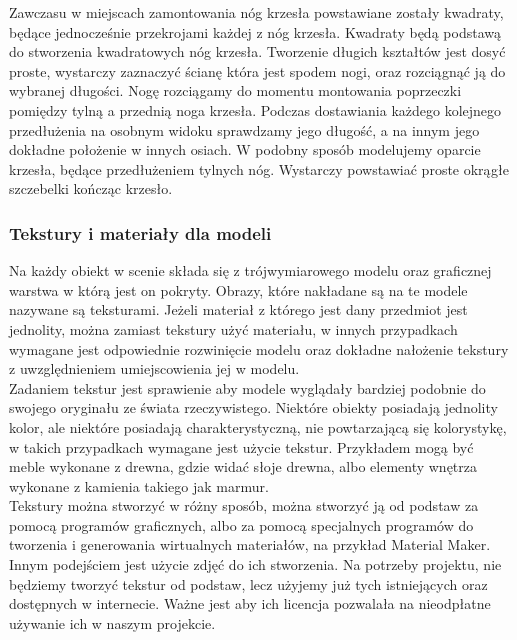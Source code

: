 \documentclass{article} %
\begin{document}
            Zawczasu w miejscach zamontowania nóg krzesła powstawiane zostały kwadraty, będące jednocześnie przekrojami każdej z nóg krzesła. Kwadraty będą podstawą do stworzenia kwadratowych nóg krzesła. Tworzenie długich kształtów jest dosyć proste, wystarczy zaznaczyć ścianę która jest spodem nogi, oraz rozciągnąć ją do wybranej długości. Nogę rozciągamy do momentu montowania poprzeczki pomiędzy tylną a przednią noga krzesła. Podczas dostawiania każdego kolejnego przedłużenia na osobnym widoku sprawdzamy jego długość, a na innym jego dokładne położenie w innych osiach. W podobny sposób modelujemy oparcie krzesła, będące przedłużeniem tylnych nóg. Wystarczy powstawiać proste okrągłe szczebelki kończąc krzesło.
            \\
            
        \subsubsection{Tekstury i materiały dla modeli}
            Na każdy obiekt w scenie składa się z trójwymiarowego modelu oraz graficznej warstwa w którą jest on pokryty. Obrazy, które nakładane są na te modele nazywane są teksturami. Jeżeli materiał z którego jest dany przedmiot jest jednolity, można zamiast tekstury użyć materiału, w innych przypadkach wymagane jest odpowiednie rozwinięcie modelu oraz dokładne nałożenie tekstury z uwzględnieniem umiejscowienia jej w modelu.
            \\
        
            Zadaniem tekstur jest sprawienie aby modele wyglądały bardziej podobnie do swojego oryginału ze świata rzeczywistego. Niektóre obiekty posiadają jednolity kolor, ale niektóre posiadają charakterystyczną, nie powtarzającą się kolorystykę, w takich przypadkach wymagane jest użycie tekstur. Przykładem mogą być meble wykonane z drewna, gdzie widać słoje drewna, albo elementy wnętrza wykonane z kamienia takiego jak marmur.
            \\
            
            Tekstury można stworzyć w różny sposób, można stworzyć ją od podstaw za pomocą programów graficznych, albo za pomocą specjalnych programów do tworzenia i generowania wirtualnych materiałów, na przykład Material Maker. Innym podejściem jest użycie zdjęć do ich stworzenia. Na potrzeby projektu, nie będziemy tworzyć tekstur od podstaw, lecz użyjemy już tych istniejących oraz dostępnych w internecie. Ważne jest aby ich licencja pozwalała na nieodpłatne używanie ich w naszym projekcie.
            \\
            
\end{document}
